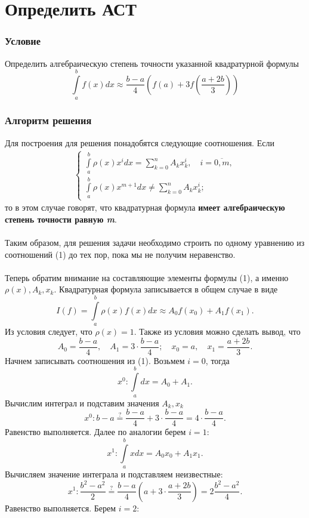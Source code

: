 \documentclass[a4paper, 12pt]{article}
\begin{document}
	\section*{Определить АСТ}
	\subsubsection*{Условие}
	Определить алгебраическую степень точности указанной квадратурной формулы
	$$\int\limits_a^b f(x)dx \approx \dfrac{b-a}{4}\left(f(a) + 3f\left(\dfrac{a+2b}{3}\right)\right)$$
	\subsubsection*{Алгоритм решения}
	Для построения для решения понадобятся следующие соотношения. Если \begin{eqnarray}
		\begin{cases}
			\int\limits_a^b \rho(x) x^idx = \sum\limits_{k=0}^{n}A_kx^i_k,\quad i=\overline{0,m},\\
			\int\limits_a^b \rho(x) x^{m+1}dx \ne \sum\limits_{k=0}^{n}A_kx^i_k;
		\end{cases}
	\end{eqnarray}
	то в этом случае говорят, что квадратурная формула \textbf{имеет алгебраическую степень точности равную \textit{m}}.\\\\
	Таким образом, для решения задачи необходимо строить по одному уравнению из соотношений (1) до тех пор, пока мы не получим неравенство.\\\\
	Теперь обратим внимание на составляющие элементы формулы (1), а именно $\rho(x), A_k, x_k$. Квадратурная формула записывается в общем случае в виде $$I(f) = \int\limits_a^b\rho(x)f(x)dx \approx A_0f(x_0) + A_1 f(x_1).$$
	Из условия следует, что $\rho(x) = 1$. Также из условия можно сделать вывод, что $$A_0 = \dfrac{b-a}{4},\quad A_1 = 3\cdot \dfrac{b-a}{4};\quad x_0 = a,\quad x_1 = \dfrac{a+2b}{3}.$$
	Начнем записывать соотношения из (1). Возьмем $i=0$, тогда $$x^0 : \int\limits_a^b dx = A_0 + A_1.$$
	Вычислим интеграл и подставим значения $A_k, x_k$ $$x^0 : b-a \overset{?}{=} \dfrac{b-a}{4} + 3\cdot \dfrac{b-a}{4} =4\cdot \dfrac{ b-a}{4}.$$
	Равенство выполняется. Далее по аналогии берем $i=1$:
	$$x^1 : \int\limits_a^bx dx = A_0x_0 + A_1x_1.$$
	Вычисляем значение интеграла и подставляем неизвестные:
	$$x^1 : \dfrac{b^2-a^2}{2} \overset{?}{=} \dfrac{b-a}{4}\left(a + 3\cdot \dfrac{a+2b}{3}\right) = 2\dfrac{b^2-a^2}{4}.$$
	Равенство выполняется. Берем $i=2$:
\end{document}
